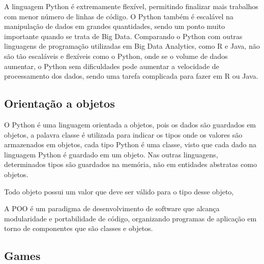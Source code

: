         A linguagem Python é extremamente flexível, permitindo finalizar mais trabalhos com menor número de linhas de código. O Python também é escalável na manipulação de dados em grandes quantidades, sendo um ponto muito importante quando se trata de Big Data. Comparando o Python com outras linguagens de programação utilizadas em Big Data Analytics, como R e Java, não são tão escaláveis e flexíveis como o Python, onde se o volume de dados aumentar, o Python sem dificuldades pode aumentar a velocidade de processamento dos dados, sendo uma tarefa complicada para fazer em R ou Java.

        \subsection{Orientação a objetos}
        O Python é uma linguagem orientada a objetos, pois os dados são guardados em objetos, a palavra classe é utilizada para indicar os tipos onde os valores são armazenados em objetos, cada tipo Python é uma classe, visto que cada dado na linguagem Python é guardado em um objeto. Nas outras linguagens, determinados tipos são guardados na memória, não em entidades abstratas como objetos.
        
        Todo objeto possui um valor que deve ser válido para o tipo desse objeto,  
        
         A POO é um paradigma de
        desenvolvimento de software que alcança modularidade e portabilidade de código, organizando
        programas de aplicação em torno de componentes que são classes e objetos.

        \subsection{Games} 